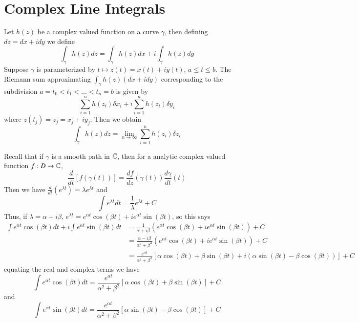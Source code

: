 \documentclass[12pt, a4paper, oneside, openright, titlepage]{book}
\begin{document}
\section{Complex Line Integrals}

Let $h(z)$ be a complex valued function on a curve $\gamma$, then defining $dz = dx+idy$ we define \begin{equation*}
    \int_{\gamma}h(z)dz = \int_{\gamma}h(z)dx + i\int_{\gamma}h(z)dy
\end{equation*}
Suppose $\gamma$ is parameterized by $t \mapsto z(t) = x(t)+iy(t)$, $a \leq t \leq b$. The Riemann sum approximating $\int_{\gamma}h(z)(dx+idy)$ corresponding to the subdivision $a = t_0 < t_1 < ... < t_n = b$ is given by \begin{equation*}
    \sum_{i=1}^nh(z_i)\delta x_i+i\sum_{i=1}^nh(z_i)\delta y_i
\end{equation*}
where $z(t_j) = z_j = x_j + iy_j$. Then we obtain \begin{equation*}
    \int_{\gamma}h(z)dz = \lim\limits_{n\rightarrow \infty}\sum_{i=1}^nh(z_i)\delta z_i
\end{equation*}


Recall that if $\gamma$ is a smooth path in $\mathbb C$, then for a analytic complex valued function $f:D\rightarrow \mathbb C$, \begin{equation*}
    \frac{d}{dt}\left[f(\gamma(t))\right] = \frac{df}{dz}(\gamma(t))\frac{d\gamma}{dt}(t)
\end{equation*}
Then we have $\frac{d}{dt}(e^{\lambda t}) = \lambda e^{\lambda t}$ and \begin{equation*}
    \int e^{\lambda t}dt = \frac{1}{\lambda}e^{\lambda t}+C
\end{equation*}
Thus, if $\lambda = \alpha+i\beta$, $e^{\lambda t} = e^{\alpha t}\cos(\beta t)+ie^{\alpha t}\sin(\beta t)$, so this says \begin{align*}
    \int e^{\alpha t}\cos(\beta t)dt + i\int e^{\alpha t}\sin(\beta t)dt &= \frac{1}{\alpha+i\beta}(e^{\alpha t}\cos(\beta t)+ie^{\alpha t}\sin(\beta t)) + C \\
    &= \frac{\alpha-i\beta}{\alpha^2+\beta^2}(e^{\alpha t}\cos(\beta t)+ie^{\alpha t}\sin(\beta t)) + C \\
    &= \frac{e^{\alpha t}}{\alpha^2+\beta^2}[\alpha\cos(\beta t) + \beta\sin(\beta t) + i(\alpha\sin(\beta t) - \beta\cos(\beta t))] + C
\end{align*}
equating the real and complex terms we have \begin{equation*}
    \int e^{\alpha t}\cos(\beta t)dt = \frac{e^{\alpha t}}{\alpha^2+\beta^2}[\alpha\cos(\beta t) + \beta\sin(\beta t)] + C
\end{equation*}
and \begin{equation*}
    \int e^{\alpha t}\sin(\beta t)dt = \frac{e^{\alpha t}}{\alpha^2+\beta^2}[\alpha\sin(\beta t) - \beta\cos(\beta t)] + C
\end{equation*}
\end{document}
